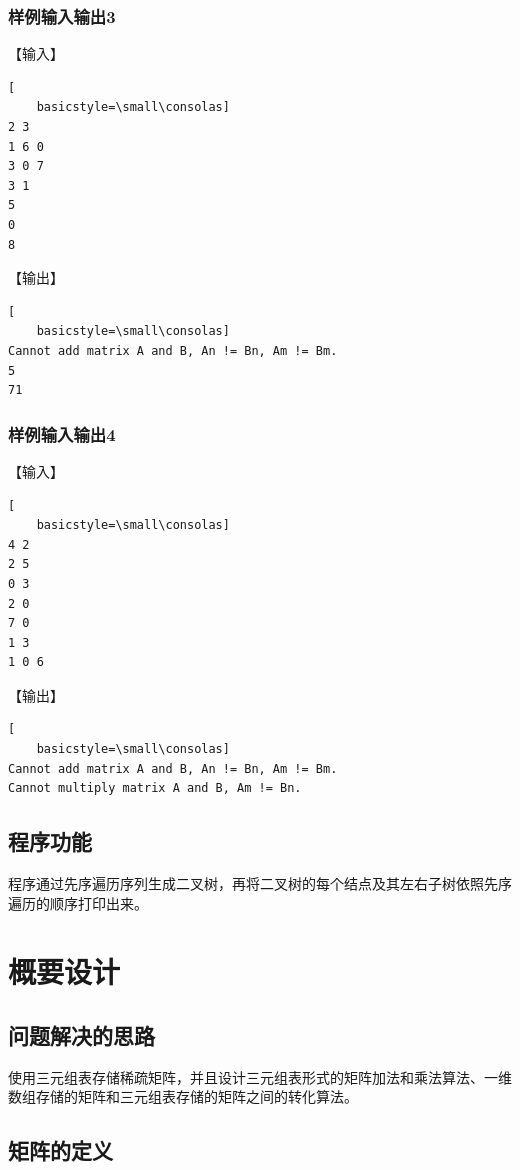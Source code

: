 \documentclass{article}
\begin{document}
\subsubsection{样例输入输出3}

【输入】

\begin{lstlisting}[
    basicstyle=\small\consolas]
2 3
1 6 0
3 0 7
3 1
5
0
8
\end{lstlisting}

【输出】

\begin{lstlisting}[
    basicstyle=\small\consolas]
Cannot add matrix A and B, An != Bn, Am != Bm.
5 
71 
\end{lstlisting}

\subsubsection{样例输入输出4}

【输入】

\begin{lstlisting}[
    basicstyle=\small\consolas]
4 2
2 5
0 3
2 0
7 0
1 3
1 0 6
\end{lstlisting}

【输出】

\begin{lstlisting}[
    basicstyle=\small\consolas]
Cannot add matrix A and B, An != Bn, Am != Bm.
Cannot multiply matrix A and B, Am != Bn.
\end{lstlisting}

\subsection{程序功能}

程序通过先序遍历序列生成二叉树，再将二叉树的每个结点及其左右子树依照先序遍历的顺序打印出来。

\section{概要设计}

\subsection{问题解决的思路}

使用三元组表存储稀疏矩阵，并且设计三元组表形式的矩阵加法和乘法算法、一维数组存储的矩阵和三元组表存储的矩阵之间的转化算法。

\subsection{矩阵的定义}
\end{document}
